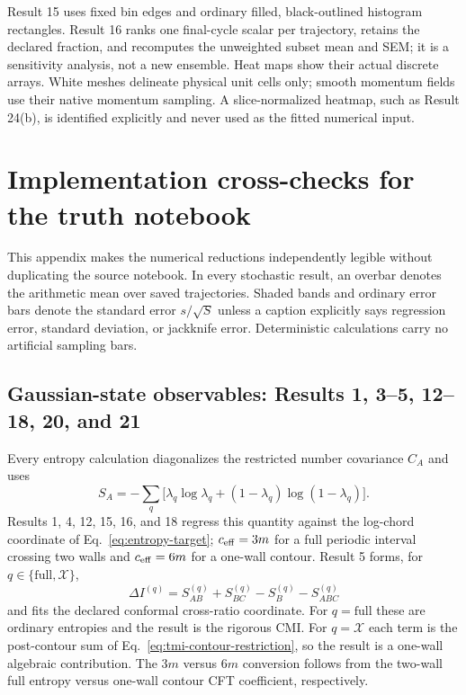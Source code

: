 \documentclass[aps,prb,twocolumn,floatfix,nofootinbib,superscriptaddress]{revtex4-2}
\begin{document}
Result 15 uses fixed bin edges and ordinary filled, black-outlined histogram rectangles.
Result 16 ranks one final-cycle scalar per trajectory, retains the declared fraction, and
recomputes the unweighted subset mean and SEM; it is a sensitivity analysis, not a new
ensemble.  Heat maps show their actual discrete arrays.  White meshes delineate physical
unit cells only; smooth momentum fields use their native momentum sampling.  A
slice-normalized heatmap, such as Result 24(b), is identified explicitly and never used as
the fitted numerical input.

\section{Implementation cross-checks for the truth notebook}

This appendix makes the numerical reductions independently legible without duplicating
the source notebook.  In every stochastic result, an overbar denotes the arithmetic mean
over saved trajectories.  Shaded bands and ordinary error bars denote the standard error
$s/\sqrt{S}$ unless a caption explicitly says regression error, standard deviation, or
jackknife error.  Deterministic calculations carry no artificial sampling bars.

\subsection{Gaussian-state observables: Results 1, 3--5, 12--18, 20, and 21}

Every entropy calculation diagonalizes the restricted number covariance $C_A$ and uses
\begin{equation}
 S_A=-\sum_q\bigl[\lambda_q\log\lambda_q+
 (1-\lambda_q)\log(1-\lambda_q)\bigr].
 \label{eq:atlas-recipe-entropy}
\end{equation}
Results 1, 4, 12, 15, 16, and 18 regress this quantity against the log-chord coordinate
of Eq.~\eqref{eq:entropy-target}; $c_{\rm eff}=3m$ for a full periodic interval crossing
two walls and $c_{\rm eff}=6m$ for a one-wall contour.  Result 5 forms, for
$q\in\{\mathrm{full},\mathcal X\}$,
\begin{equation}
 \Delta I^{(q)}=S_{AB}^{(q)}+S_{BC}^{(q)}
 -S_B^{(q)}-S_{ABC}^{(q)}
 \label{eq:atlas-recipe-tmi}
\end{equation}
and fits the declared conformal cross-ratio coordinate.  For $q=\mathrm{full}$ these are
ordinary entropies and the result is the rigorous CMI.  For $q=\mathcal X$ each term is
the post-contour sum of Eq.~\eqref{eq:tmi-contour-restriction}, so the result is a
one-wall algebraic contribution.  The $3m$ versus $6m$ conversion follows from the
two-wall full entropy versus one-wall contour CFT coefficient, respectively.
\end{document}
